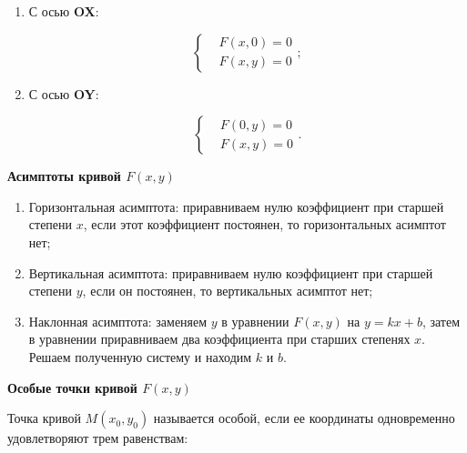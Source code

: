                     \begin{enumerate}
                        \item С осью \textbf{OX}:

                            \[
                                \begin{cases}
                                    & F \left( x, 0 \right) = 0\\
                                    & F \left( x, y \right) = 0
                                \end{cases};
                            \]

                        \item С осью \textbf{OY}:

                            \[
                                \begin{cases}
                                    & F \left( 0, y \right) = 0\\
                                    & F \left( x, y \right) = 0
                                \end{cases}.
                            \]

                    \end{enumerate}

                \textbf{Асимптоты кривой $F \left( x, y \right)$}

                    \begin{enumerate}
                        \item Горизонтальная асимптота: приравниваем нулю коэффициент при старшей степени $x$, если этот коэффициент постоянен, то горизонтальных асимптот нет;

                        \item Вертикальная асимптота: приравниваем нулю коэффициент при старшей степени $y$, если он постоянен, то вертикальных асимптот нет;

                        \item Наклонная асимптота: заменяем $y$ в уравнении $F \left( x, y \right)$ на $y = k x + b$, затем в уравнении  приравниваем два коэффициента при старших степенях $x$. Решаем полученную систему и находим $k$ и $b$.
                    \end{enumerate}

                \textbf{Особые точки кривой $F \left( x, y \right)$}

                    Точка  кривой $M \left( x_{0}, y_{0} \right)$ называется особой, если ее координаты одновременно удовлетворяют трем равенствам:

